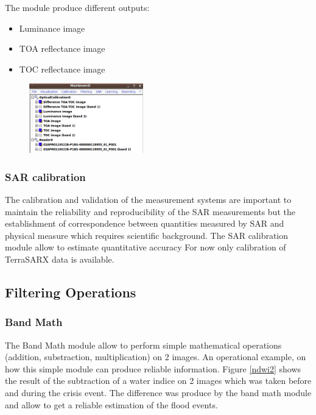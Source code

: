 The module produce different outputs:

\begin{itemize}
\item Luminance image
\item TOA reflectance image
\item TOC reflectance image
\end{itemize}


\begin{figure}
  \center
  \includegraphics[width=0.44\textwidth]{../Art/MonteverdiImages/monteverdi_optical_calibration_outputs.png}
  \label{fig:opticalcalibrationoutput}
\end{figure}

\subsubsection{SAR calibration}

The calibration and validation of the measurement systems are
important to maintain the reliability and reproducibility of the SAR
measurements but the establishment of correspondence between
quantities measured by SAR and physical measure which requires
scientific background. The SAR calibration module allow to estimate
quantitative accuracy For now only calibration of TerraSARX data is
available.

\subsection{Filtering Operations}
\subsubsection{Band Math}
The Band Math module allow to perform simple mathematical operations
(addition, substraction, multiplication) on 2 images.  An operational
example, on how this simple module can produce reliable information.
Figure \ref{ndwi2} shows the result of the subtraction of a water
indice on 2 images which was taken before and during the crisis event.
The difference was produce by the band math module and allow to get a
reliable estimation of the flood events.

